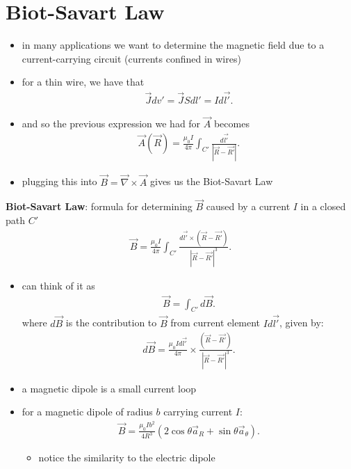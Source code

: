 \documentclass[10pt]{article}
\begin{document}
\section{Biot-Savart Law}
\begin{itemize}
    \item in many applications we want to determine the magnetic field due to a current-carrying circuit (currents confined in wires)
    \item for a thin wire, we have that 
        \begin{gather*}
            \vec{J} dv' = \vec{J} Sdl' = Id\vec{l'} 
        .\end{gather*}
    \item and so the previous expression we had for $\vec{A} $ becomes 
        \begin{gather*}
            \vec{A}(\vec{R}) = \frac{\mu_0I}{4\pi} \int_{C'} \frac{d\vec{l'}}{|\vec{R} - \vec{R'}|} 
        .\end{gather*}
    \item plugging this into $\vec{B} = \vec{\nabla } \times \vec{A}$ gives us the Biot-Savart Law
\end{itemize}
\begin{theorem}
    \textbf{Biot-Savart Law}: formula for determining $ \vec{B} $ caused by a current $I$ in a closed path $C'$ 
    \begin{gather*}
        \vec{B} = \frac{\mu_0I}{4\pi} \int_{C'} \frac{d\vec{l'} \times (\vec{R} - \vec{R'})}{|\vec{R} - \vec{R'}|^3} 
    .\end{gather*}
    \begin{itemize}
        \item can think of it as 
            \begin{gather*}
                \vec{B} = \int_{C'} d\vec{B}    
            .\end{gather*}
            where $d\vec{B}$ is the contribution to $\vec{B} $ from current element $Id\vec{l'} $, given by:
            \begin{gather*}
                d\vec{B} = \frac{\mu_0Id\vec{l'}}{4\pi} \times \frac{(\vec{R} - \vec{R'})}{|\vec{R} - \vec{R'}|^3}
            .\end{gather*}
    \end{itemize}
\end{theorem}
\begin{itemize}
    \item a magnetic dipole is a small current loop
    \item for a magnetic dipole of radius $b$ carrying current $I$:
        \begin{gather*}
            \vec{B} = \frac{\mu_0Ib^2}{4R^3} (2\cos\theta \vec{a}_R + \sin\theta \vec{a}_\theta)
        .\end{gather*}
        \begin{itemize}
            \item notice the similarity to the electric dipole
        \end{itemize}
\end{itemize}
\end{document}
